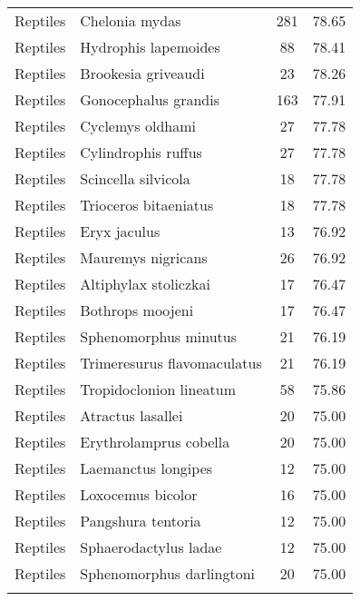 \begin{longtable}{llcc}
  Reptiles & Chelonia mydas & 281 & 78.65 \\ 
  Reptiles & Hydrophis lapemoides &  88 & 78.41 \\ 
  Reptiles & Brookesia griveaudi &  23 & 78.26 \\ 
  Reptiles & Gonocephalus grandis & 163 & 77.91 \\ 
  Reptiles & Cyclemys oldhami &  27 & 77.78 \\ 
  Reptiles & Cylindrophis ruffus &  27 & 77.78 \\ 
  Reptiles & Scincella silvicola &  18 & 77.78 \\ 
  Reptiles & Trioceros bitaeniatus &  18 & 77.78 \\ 
  Reptiles & Eryx jaculus &  13 & 76.92 \\ 
  Reptiles & Mauremys nigricans &  26 & 76.92 \\ 
  Reptiles & Altiphylax stoliczkai &  17 & 76.47 \\ 
  Reptiles & Bothrops moojeni &  17 & 76.47 \\ 
  Reptiles & Sphenomorphus minutus &  21 & 76.19 \\ 
  Reptiles & Trimeresurus flavomaculatus &  21 & 76.19 \\ 
  Reptiles & Tropidoclonion lineatum &  58 & 75.86 \\ 
  Reptiles & Atractus lasallei &  20 & 75.00 \\ 
  Reptiles & Erythrolamprus cobella &  20 & 75.00 \\ 
  Reptiles & Laemanctus longipes &  12 & 75.00 \\ 
  Reptiles & Loxocemus bicolor &  16 & 75.00 \\ 
  Reptiles & Pangshura tentoria &  12 & 75.00 \\ 
  Reptiles & Sphaerodactylus ladae &  12 & 75.00 \\ 
  Reptiles & Sphenomorphus darlingtoni &  20 & 75.00 \\ 
   \hline
\hline
\label{table-best}
\end{longtable}
